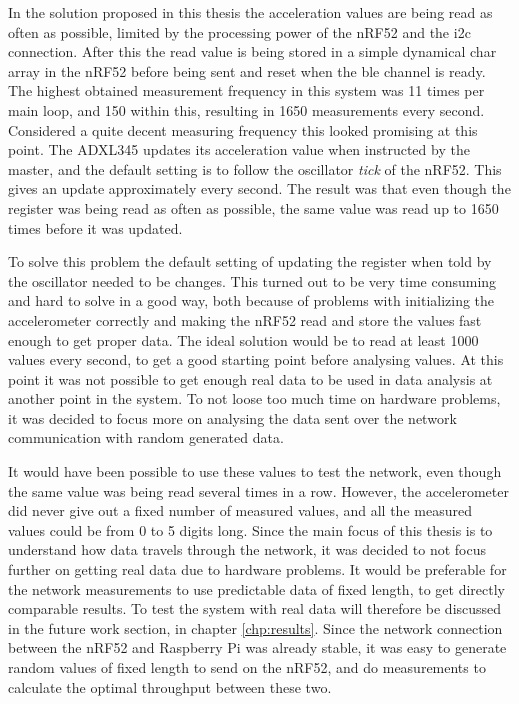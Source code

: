 \noindent In the solution proposed in this thesis the acceleration values are being read as often as possible, limited by the processing power of the \gls{nRF52} and the \gls{i2c} connection. After this the read value is being stored in a simple dynamical char array in the \gls{nRF52} before being sent and reset when the \gls{ble} channel is ready. The highest obtained measurement frequency in this system was 11 times per main loop, and 150 within this, resulting in 1650 measurements every second. Considered a quite decent measuring frequency this looked promising at this point. The \gls{ADXL345} updates its acceleration value when instructed by the master, and the default setting is to follow the oscillator \textit{tick} of the \gls{nRF52}. This gives an update approximately every second. The result was that even though the register was being read as often as possible, the same value was read up to 1650 times before it was updated. 

\noindent To solve this problem the default setting of updating the register when told by the oscillator needed to be changes. This turned out to be very time consuming and hard to solve in a good way, both because of problems with initializing the accelerometer correctly and making the nRF52 read and store the values fast enough to get proper data. The ideal solution would be to read at least 1000 values every second, to get a good starting point before analysing values. At this point it was not possible to get enough real data to be used in data analysis at another point in the system. To not loose too much time on hardware problems, it was decided to focus more on analysing the data sent over the network communication with random generated data. 

\noindent It would have been possible to use these values to test the network, even though the same value was being read several times in a row. However, the accelerometer did never give out a fixed number of measured values, and all the measured values could be from 0 to 5 digits long. Since the main focus of this thesis is to understand how data travels through the network, it was decided to not focus further on getting real data due to hardware problems. It would be preferable for the network measurements to use predictable data of fixed length, to get directly comparable results. To test the system with real data will therefore be discussed in the future work section, in chapter \ref{chp:results}. Since the network connection between the \gls{nRF52} and \gls{Raspberry Pi} was already stable, it was easy to generate random values of fixed length to send on the \gls{nRF52}, and do measurements to calculate the optimal throughput between these two. 

